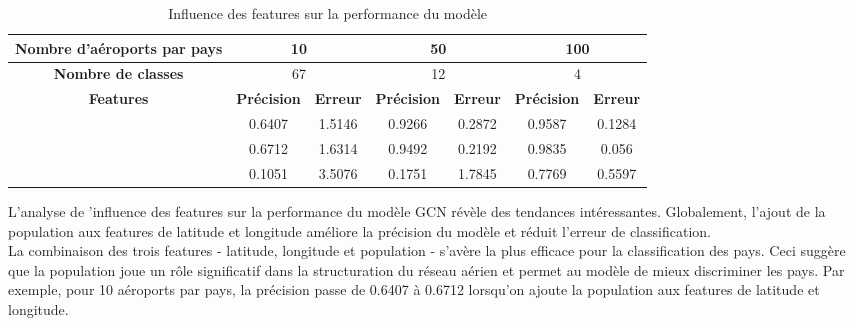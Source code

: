 \begin{table}[h!]
    \centering

    \begin{tabular}{|c||c|c|c|c|c|c|}
        \hline
        \textbf{Nombre d'aéroports par pays} & \multicolumn{2}{c|}{10} & \multicolumn{2}{c|}{50} & \multicolumn{2}{c|}{100}                                                          \\ \hline
        \textbf{Nombre de classes}           & \multicolumn{2}{c|}{67} & \multicolumn{2}{c|}{12} & \multicolumn{2}{c|}{4}                                                            \\ \hline \hline
        \textbf{Features}                    & \textbf{Précision}      & \textbf{Erreur}         & \textbf{Précision}       & \textbf{Erreur} & \textbf{Précision} & \textbf{Erreur} \\ \hline
        [latitude, longitude]                & 0.6407                  & 1.5146                  & 0.9266                   & 0.2872          & 0.9587             & 0.1284          \\ \hline
        [latitude, longitude, population]    & 0.6712                  & 1.6314                  & 0.9492                   & 0.2192          & 0.9835             & 0.056           \\ \hline
        [population]                         & 0.1051                  & 3.5076                  & 0.1751                   & 1.7845          & 0.7769             & 0.5597          \\ \hline

    \end{tabular}
    \caption{Influence des features sur la performance du modèle}
\end{table}

L'analyse de 'influence des features sur la performance du modèle GCN révèle
des tendances intéressantes. Globalement, l'ajout de la population aux features
de latitude et longitude améliore la précision du modèle et réduit l'erreur de
classification.\\

La combinaison des trois features - latitude, longitude et population - s'avère
la plus efficace pour la classification des pays. Ceci suggère que la
population joue un rôle significatif dans la structuration du réseau aérien et
permet au modèle de mieux discriminer les pays. Par exemple, pour 10 aéroports
par pays, la précision passe de 0.6407 à 0.6712 lorsqu'on ajoute la population
aux features de latitude et longitude.\\

